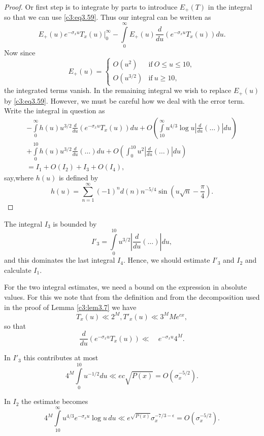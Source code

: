 \begin{proof}
  Or first step is to integrate by parts to introduce $E_+ (T)$ in the
  integral so that we can use \eqref{c3:eq3.59}. Thus our integral can
  be written as
  $$
  E_+ (u) e^{-\sigma_xu} T_x (u) \Bigg|_0^\infty - \int\limits_0^\infty
  E_+ (u) \frac{d}{du} \left(e^{-\sigma_xu}T_x(u) \right)du.
  $$
  Now since
  $$
  E_+ (u) = 
  \begin{cases}
    O(u^2) & \text{if}~ O \leq u \leq 10,\\
    O(u^{3/2}) & \text{if}~ u \geq 10,
  \end{cases}
  $$
  the integrated terms vanish. In the remaining integral we wish to
  replace $E_+ (u)$ by \eqref{c3:eq3.59}. However, we must be careful
  how we deal with the error term. Write the integral in question as
  \begin{multline*}
  - \int\limits_0^\infty h(u) u^{3/2} \frac{d}{du} \left(e^{-\sigma_x
    u} T_x (u) \right) du + O\left(\int\limits_{10}^\infty u^{4/3}
  \log u \left| \frac{d}{du} (\ldots)\right|du  \right)\\
  + \int\limits_0^{10} h(u) u^{3/2} \frac{d}{du} (\ldots)du +
  O\left(\int_0^{10} u^2 \left|\frac{d}{du} (\ldots ) \right|du
  \right)\\
  = I_1 + O(I_2) + I_3 + O(I_4),
  \end{multline*}
  say,\pageoriginale where $h(u)$ is defined by
  $$
  h(u) = \sum_{n=1}^\infty (-1)^n d(n) n^{-5/4} \sin \left(u \sqrt{n} -
  \frac{\pi}{4}\right). 
  $$
\end{proof}

The integral $I_3$ is bounded by
$$
I'_3 = \int\limits_0^{10} u^{3/2} \left| \frac{d}{du} (\ldots)\right|du,
$$
and this dominates the last integral $I_4$. Hence, we should estimate
$I'_3$ and $I_2$ and calculate $I_1$.

For the two integral estimates, we need a bound on the expression in
absolute values. For this we note that from the definition and from
the decomposition used in the proof of Lemma \ref{c3:lem3.7} we have 
$$
T_x (u) \ll 2^M, T'_x (u) \ll 3^M M e^{cx},
$$
so that
$$
\frac{d}{du} \left(e^{-\sigma_x u} T_x(u) \right) \ll \quad 
e^{- \sigma_x u}4^M.
$$

In $I'_3$ this contributes at most
$$ 
4^M \int\limits_0^{10} u^{-1/2} du \ll e c\sqrt{P(x)} =
O(\sigma_x^{-5/2}). 
$$

In $I_2$ the estimate becomes
$$
4^M \int\limits_{10}^\infty u^{4/3}e^{-\sigma_x u} \log u\, du \ll
e^{\sqrt{P(x)}} \sigma_x^{-7/3-\epsilon} = O(\sigma_x^{-5/2}).
$$

